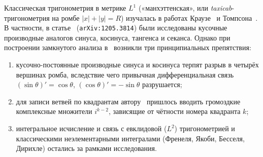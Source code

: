 \documentclass[11pt,a4paper]{article}
\theoremstyle{plain}
\theoremstyle{definition}
\begin{document}
Классическая тригонометрия в метрике $L^1$ («манхэттенская», или \emph{taxicab}-тригонометрия на ромбе $|x|+|y|=R$) изучалась в работах Краузе~\cite{Krause1986} и Томпсона~\cite{Thompson2011,Thompson2012}. В частности, в статье~\cite{Thompson2012} (\texttt{arXiv:1205.3814}) были исследованы кусочные производные аналогов синуса, косинуса, тангенса и секанса. Однако при построении замкнутого анализа в~\cite{Thompson2012} возникли три принципиальных препятствия:
\begin{enumerate}[leftmargin=*,noitemsep]
\item кусочно-постоянные производные синуса и косинуса терпят разрыв в четырёх вершинах ромба, вследствие чего привычная дифференциальная связь $(\sin\theta)'=\cos\theta$, $(\cos\theta)'=-\sin\theta$ разрушается;
\item для записи ветвей по квадрантам автору~\cite{Thompson2012} пришлось вводить громоздкие комплексные множители $i^{k-2}$, зависящие от чётности номера квадранта $k$;
\item интегральное исчисление и связь с евклидовой ($L^2$) тригонометрией и классическими неэлементарными интегралами (Френеля, Якоби, Бесселя, Дирихле) остались за рамками исследования.
\end{enumerate}
\end{document}
